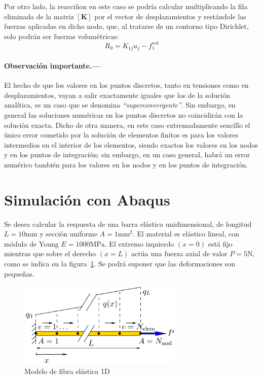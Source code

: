 \documentclass[spanish,a4paper,12pt]{article}
\begin{document}
 Por otro lado, la reacciñon en este caso se podría calcular multiplicando la fila eliminada de la matriz $[\mathbf{K}]$ por el vector de desplazamientos y restándole las fuerzas aplicadas en dicho nodo, que, al tratarse de un contorno tipo Dirichlet, solo podrán ser fuerzas volumétricas:
 $$
 R_0=K_{1j}u_j-f^{\text {vol}}_1
$$

\paragraph{Observación importante.---}
El hecho de que los valores en los puntos discretos, tanto en tensiones como en desplazamientos, vayan a salir exactamente iguales que los de la solución analítica, es un caso que se denomina \emph{``superconvergente''}. 
Sin embargo, en general las soluciones numéricas en los puntos discretos no coincidirán con la solución exacta.
Dicho de otra manera, en este caso extremadamente sencillo el único error cometido por la solución de elementos finitos es para los valores intermedios en el interior de los elementos, siendo exactos los valores en los nodos y en los puntos de integración; sin embargo, en un caso general, habrá un error numérico también para los valores en los nodos y en los puntos de integración.


\clearpage

\section{Simulación con Abaqus}
\label{sec:abaqus}

Se desea calcular la respuesta de una barra elástica unidimensional, de longitud \(L=10 \mathrm{mm}\)
y sección uniforme \(A=1 \mathrm{mm}^{2} .\) El material es elástico lineal, con módulo de Young \(E=1000 \mathrm{MPa}\).
El extremo izquierdo \((x=0)\) está fijo mientras que sobre el derecho \((x=L)\) actúa una fuerza
axial de valor \(P=5 \mathrm{N},\) como se indica en la figura~\ref{fig:esq}. Se podrá suponer que las deformaciones son pequeñas.

\begin{figure}[!htp]
\centering
\includegraphics[width=0.7\textwidth]{figuras/esquema.pdf}
\caption{Modelo de fibra elástica 1D}
\label{fig:esq}
\end{figure}
\end{document}
